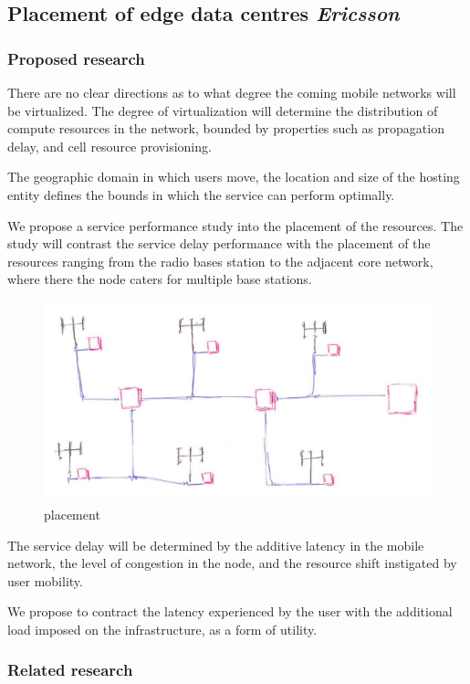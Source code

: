 \subsection{Placement of edge data centres \emph{Ericsson}}
\subsubsection{Proposed research}
There are no clear directions as to what degree the coming mobile networks will be virtualized. The degree of virtualization will determine the distribution of compute resources in the network, bounded by properties such as propagation delay, and cell resource provisioning.

The geographic domain in which users move, the location and size of the \xcloud hosting entity defines the bounds in which the service can perform optimally.

We propose a service performance study into the placement of the \xcloud resources. The study will contrast the service delay performance with the placement of the \xcloud resources ranging from the radio bases station to the adjacent core network, where there the \xcloud node caters for multiple base stations.

\begin{figure}
	\centering
	\includegraphics[width=\linewidth]{placement_diagram.jpg}
	\caption{\xcloud placement}
	\label{diagram_placement}
\end{figure}

The service delay will be determined by the additive latency in the mobile network, the level of congestion in the \xcloud node, and the resource shift instigated by user mobility.

We propose to contract the latency experienced by the user with the additional load imposed on the \xcloud infrastructure, as a form of utility.
\subsubsection{Related research}


